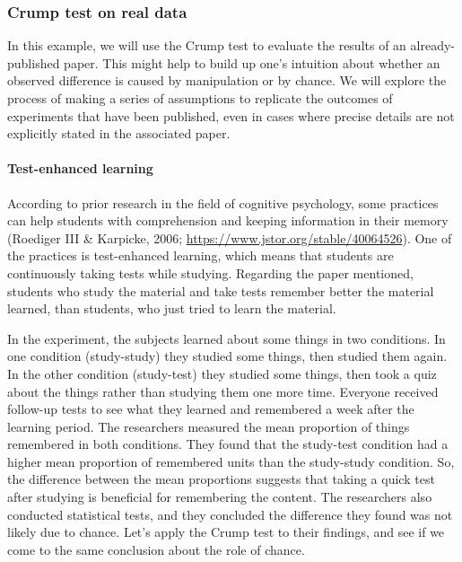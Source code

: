 \documentclass[
]{book}
\begin{document}
\hypertarget{crump-test-on-real-data}{%
\subsubsection{Crump test on real data}\label{crump-test-on-real-data}}

In this example, we will use the Crump test to evaluate the results of an already-published paper. This might help to build up one's intuition about whether an observed difference is caused by manipulation or by chance. We will explore the process of making a series of assumptions to replicate the outcomes of experiments that have been published, even in cases where precise details are not explicitly stated in the associated paper.

\hypertarget{test-enhanced-learning-1}{%
\paragraph{Test-enhanced learning}\label{test-enhanced-learning-1}}

According to prior research in the field of cognitive psychology, some practices can help students with comprehension and keeping information in their memory (Roediger III \& Karpicke, 2006; \url{https://www.jstor.org/stable/40064526}). One of the practices is test-enhanced learning, which means that students are continuously taking tests while studying. Regarding the paper mentioned, students who study the material and take tests remember better the material learned, than students, who just tried to learn the material.

In the experiment, the subjects learned about some things in two conditions. In one condition (study-study) they studied some things, then studied them again. In the other condition (study-test) they studied some things, then took a quiz about the things rather than studying them one more time. Everyone received follow-up tests to see what they learned and remembered a week after the learning period. The researchers measured the mean proportion of things remembered in both conditions. They found that the study-test condition had a higher mean proportion of remembered units than the study-study condition. So, the difference between the mean proportions suggests that taking a quick test after studying is beneficial for remembering the content. The researchers also conducted statistical tests, and they concluded the difference they found was not likely due to chance. Let's apply the Crump test to their findings, and see if we come to the same conclusion about the role of chance.
\end{document}
